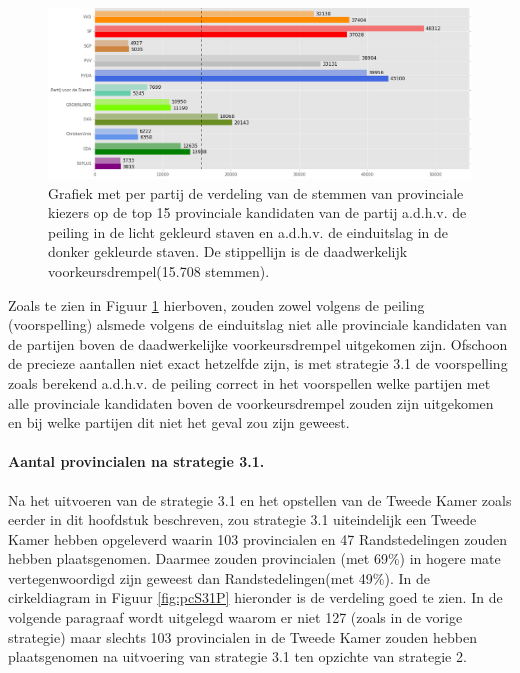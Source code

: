 \begin{figure}[H]

	\includegraphics[width=\linewidth]	{stemmen_op_provincialen_top15_of_topN_samen.png}

			\caption{Grafiek met per partij de verdeling van de stemmen van provinciale kiezers op de top 15 provinciale kandidaten van de partij a.d.h.v. de peiling \citep{IPSOS} in de licht gekleurd staven en a.d.h.v. de einduitslag \citep{Kiesraad_databank} in de donker gekleurde staven. De stippellijn is de daadwerkelijk voorkeursdrempel(15.708 stemmen).}

\label{fig:stemmenS31P}
\end{figure}

Zoals te zien in Figuur \ref{fig:stemmenS31P} hierboven, zouden zowel volgens de peiling (voorspelling) alsmede volgens de einduitslag niet alle provinciale kandidaten van de partijen boven de daadwerkelijke voorkeursdrempel uitgekomen zijn. Ofschoon de precieze aantallen niet exact hetzelfde zijn, is met strategie 3.1 de voorspelling zoals berekend a.d.h.v. de peiling correct in het voorspellen welke partijen met alle provinciale kandidaten boven de voorkeursdrempel zouden zijn uitgekomen en bij welke partijen dit niet het geval zou zijn geweest. 

\paragraph{Aantal provincialen na strategie 3.1.}
Na het uitvoeren van de strategie 3.1 en het opstellen van de Tweede Kamer zoals eerder in dit hoofdstuk beschreven, zou strategie 3.1 uiteindelijk een Tweede Kamer hebben opgeleverd waarin 103 provincialen en 47 Randstedelingen zouden hebben plaatsgenomen. Daarmee zouden provincialen (met 69\%) in hogere mate vertegenwoordigd zijn geweest dan Randstedelingen(met 49\%). In de cirkeldiagram in Figuur \ref{fig:pcS31P} hieronder is de verdeling goed te zien. In de volgende paragraaf wordt uitgelegd waarom er niet 127 (zoals in de vorige strategie) maar slechts 103 provincialen in de Tweede Kamer zouden hebben plaatsgenomen na uitvoering van strategie 3.1 ten opzichte van strategie 2.

